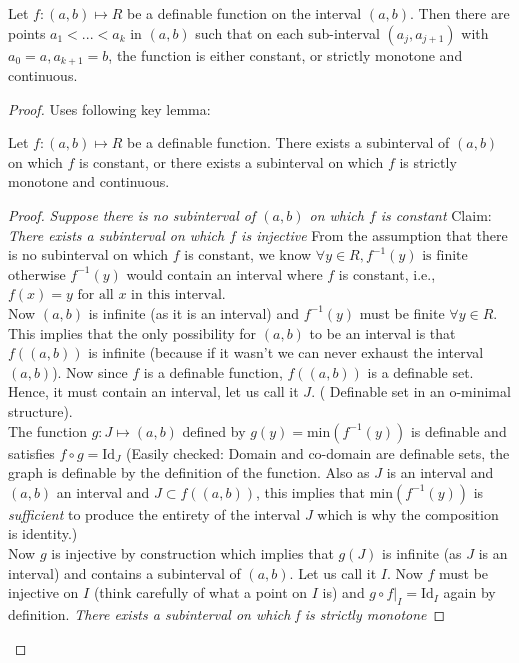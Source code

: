 \begin{definition}
\begin{theorem}[Monotinicity]
    Let $f:(a,b)\mapsto R$ be a definable function on the interval $(a,b).$ Then there are points $a_1 < ... < a_k$ in $(a,b)$ such that on each sub-interval $(a_j, a_{j+1})$ with $a_0 = a, a_{k+1} = b$, the function is either constant, or strictly monotone and continuous.
\end{theorem}

\begin{proof}
    Uses following key lemma:
    \begin{lemma}
    \label{monotone-lemma}
        Let $f: (a, b)\mapsto R$ be a definable function. There exists a subinterval of $(a,b)$ on which $f$ is constant, or there exists a subinterval on which $f$ is strictly monotone and continuous.
    \end{lemma}
    \begin{proof}
        \textit{Suppose there is no subinterval of $(a, b)$ on which $f$ is constant}
        Claim: \textit{There exists a subinterval on which $f$ is injective}
        From the assumption that there is no subinterval on which $f$ is constant, we know $\forall y\in R, f^{-1}(y) \text{ is finite}$ otherwise $f^{-1}(y)$ would contain an interval where $f$ is constant, i.e., $f(x) = y \text{ for all $x$ in this interval}$.\\ Now $(a, b)$ is infinite (as it is an interval) and $f^{-1}(y)$ must be finite $\forall y \in R$. This implies that the only possibility for $(a,b)$ to be an interval is that $f((a,b))$ is infinite (because if it wasn't we can never exhaust the interval $(a,b)$). Now since $f$ is a definable function, $f((a,b))$ is a definable set. Hence, it must contain an interval, let us call it $J$. ( Definable set in an o-minimal structure).\\ The function $g: J\mapsto(a, b)$ defined by $g(y) = \text{min}(f^{-1}(y))$ is definable and satisfies $f \circ g = \text{Id}_J$ (Easily checked: Domain and co-domain are definable sets, the graph is definable by the definition of the function. Also as $J$ is an interval and $(a, b)$ an interval and $J\subset f((a,b))$, this implies that $\text{min}(f^{-1}(y))$ is \textit{ sufficient} to produce the entirety of the interval $J$ which is why the composition is identity.)\\ Now $g$ is injective by construction which implies that $g(J)$ is infinite (as $J$ is an interval) and contains a subinterval of $(a,b)$. Let us call it $I$. Now $f$ must be injective on $I$ (think carefully of what a point on $I$ is) and $g \circ f|_I = \text{Id}_I$ again by definition.
        \textit{There exists a subinterval on which f is strictly monotone}
        

\end{proof}
\end{proof}
\end{definition}

